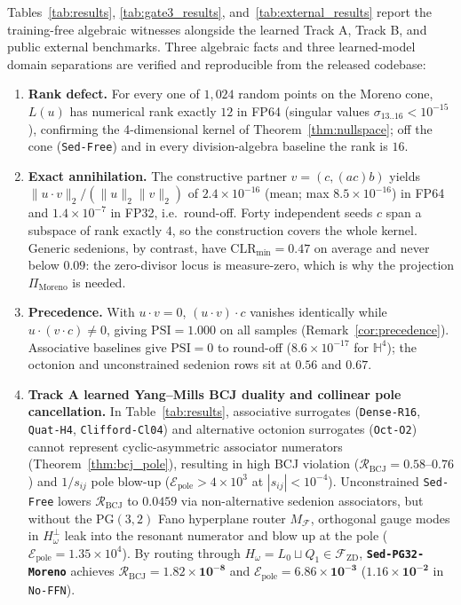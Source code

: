 \documentclass[11pt,a4paper]{article}
\theoremstyle{definition}
\theoremstyle{remark}
\newcommand{\Ha}{\mathbb{H}}
\newcommand{\PG}{\mathrm{PG}}
\newcommand{\Fzd}{\mathcal{F}_{\mathrm{ZD}}}
\newcommand{\PiMoreno}{\Pi_{\mathrm{Moreno}}}
\begin{document}
Tables~\ref{tab:results}, \ref{tab:gate3_results}, and~\ref{tab:external_results} report the training-free algebraic witnesses alongside the learned Track A, Track B, and public external benchmarks. Three algebraic facts and three learned-model domain separations are verified and reproducible from the released codebase:
\begin{enumerate}
    \item \textbf{Rank defect.} For every one of $1{,}024$ random points on the Moreno cone, $L(u)$ has numerical rank exactly $12$ in FP64 (singular values $\sigma_{13..16} < 10^{-15}$), confirming the 4-dimensional kernel of Theorem~\ref{thm:nullspace}; off the cone (\texttt{Sed-Free}) and in every division-algebra baseline the rank is $16$.
    \item \textbf{Exact annihilation.} The constructive partner $v = (c, (a c) b)$ yields $\|u \cdot v\|_2 / (\|u\|_2 \|v\|_2)$ of $2.4 \times 10^{-16}$ (mean; max $8.5 \times 10^{-16}$) in FP64 and $1.4 \times 10^{-7}$ in FP32, i.e.\ round-off. Forty independent seeds $c$ span a subspace of rank exactly $4$, so the construction covers the whole kernel. Generic sedenions, by contrast, have $\mathrm{CLR}_{\min} = 0.47$ on average and never below $0.09$: the zero-divisor locus is measure-zero, which is why the projection $\PiMoreno$ is needed.
    \item \textbf{Precedence.} With $u \cdot v = 0$, $(u \cdot v) \cdot c$ vanishes identically while $u \cdot (v \cdot c) \ne 0$, giving $\mathrm{PSI} = 1.000$ on all samples (Remark~\ref{cor:precedence}). Associative baselines give $\mathrm{PSI} = 0$ to round-off ($8.6 \times 10^{-17}$ for $\Ha^4$); the octonion and unconstrained sedenion rows sit at $0.56$ and $0.67$.
    \item \textbf{Track A learned Yang--Mills BCJ duality and collinear pole cancellation.} In Table~\ref{tab:results}, associative surrogates (\texttt{Dense-R16}, \texttt{Quat-H4}, \texttt{Clifford-Cl04}) and alternative octonion surrogates (\texttt{Oct-O2}) cannot represent cyclic-asymmetric associator numerators (Theorem~\ref{thm:bcj_pole}), resulting in high BCJ violation ($\mathcal{R}_{\mathrm{BCJ}} = 0.58\text{--}0.76$) and $1/s_{ij}$ pole blow-up ($\mathcal{E}_{\mathrm{pole}} > 4 \times 10^3$ at $|s_{ij}| < 10^{-4}$). Unconstrained \texttt{Sed-Free} lowers $\mathcal{R}_{\mathrm{BCJ}}$ to $0.0459$ via non-alternative sedenion associators, but without the $\PG(3,2)$ Fano hyperplane router $M_{\mathcal{F}}$, orthogonal gauge modes in $H_\omega^\perp$ leak into the resonant numerator and blow up at the pole ($\mathcal{E}_{\mathrm{pole}} = 1.35 \times 10^4$). By routing through $H_\omega = L_0 \sqcup Q_1 \in \Fzd$, \textbf{\texttt{Sed-PG32-Moreno}} achieves $\mathcal{R}_{\mathrm{BCJ}} = \mathbf{1.82 \times 10^{-8}}$ and $\mathcal{E}_{\mathrm{pole}} = \mathbf{6.86 \times 10^{-3}}$ ($\mathbf{1.16 \times 10^{-2}}$ in \texttt{No-FFN}).

\end{enumerate}
\end{document}
